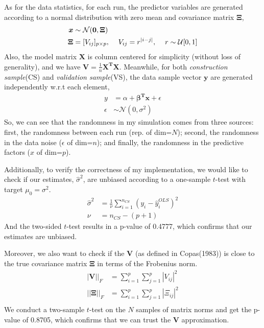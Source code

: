 \documentclass{article}\usepackage{graphicx, color}
\begin{document}
As for the data statistics, for each run, the predictor variables are
generated according to a normal distribution with zero mean and
covariance matrix $\bm{\Xi}$,
\begin{displaymath}
\begin{split}
\bm{x} &\sim  \mathcal{\bm{N}}(\bm{0}, \bm{\Xi})\\
\bm{\Xi} &= [V_{ij}]_{p\times p} , \hspace{12 pt} V_{ij} = r^{|i-j|},
\hspace{12 pt} r \sim \mathcal{U}[0,1]
\end{split}
\end{displaymath}
Also, the model matrix $\bm{X}$ is column centered for simplicity
(without loss of generality), and we have $\bm{V}=\frac{1}{n}\bm{X^TX}$. 
Meanwhile, for both \textit{construction sample}(CS) and
\textit{validation sample}(VS), the data sample vector
$\bm{y}$ are generated independently w.r.t each element,
\begin{displaymath}
\begin{split}
y &= \alpha + \bm{\beta^Tx} + \epsilon\\
\epsilon &\sim \mathcal{N}(0, \sigma^2)
\end{split}
\end{displaymath}
So, we can see that the randomness in my simulation comes from three
sources: first, the randomness between each run (rep. of dim=$N$); second, the
randomness in the data noise ($\epsilon$ of dim=$n$); and finally, the
randomness in the predictive factors ($x$ of dim=$p$).


Additionally, to verify the correctness of my implementation, we would
like to check if our estimates, $\hat{\sigma}^2$, are unbiased according to
a one-sample $t$-test with target $\mu_0=\sigma^2$.
\begin{displaymath}
\begin{split}
\hat{\sigma}^2 &= \frac{1}{\nu}\sum_{i=1}^{n_{CS}} (y_i - \hat{y}_i^{OLS})^2 \\
\nu &= n_{CS} - (p+1)
\end{split}
\end{displaymath}
And the two-sided $t$-test results in a p-value of
0.4777, 
which confirms that our estimates are unbiased.

Moreover, we also want to check if the $\bm{V}$ (as defined in
Copas(1983)) is close to the true covariance matrix $\bm{\Xi}$ in
terms of the Frobenius norm. 
\begin{displaymath}
\begin{split}
|\bm{V}||_F &= \sum_{i=1}^p \sum_{j=1}^p |V_{ij}|^2 \\
||\bm{\Xi}||_F &= \sum_{i=1}^p \sum_{j=1}^p |\Xi_{ij}|^2 \\
\end{split}
\end{displaymath}
We conduct a two-sample $t$-test on the $N$ samples of matrix norms
and get the p-value of 
0.8705,
which confirms that we can trust the $\bm{V}$ approximation.
\end{document}

